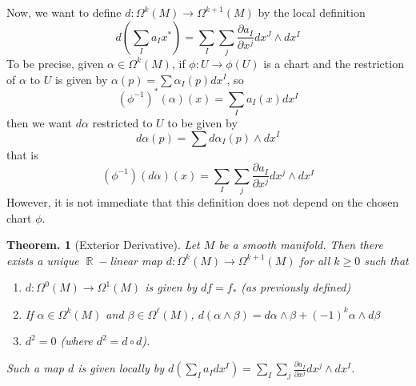 \documentclass[11pt, a4paper]{memoir}
\DeclareMathOperator{\R}{{\mathbb{R}}}
\theoremstyle{change}
\newtheorem{theorem}{Theorem.}[section]
\theoremstyle{plain}
\theoremstyle{nonumberplain}
\newcommand{\prt}[2]{\ensuremath{\frac{\partial #1}{\partial #2}}}
\numberwithin{equation}{section}
\begin{document}
Now, we want to define $d:\Omega^k(M)\to\Omega^{k+1}(M)$ by the local definition
\begin{equation*}
    d\left(\sum_Ia_Ix^*\right)=\sum_I\sum_j\prt{a_I}{x^j}dx^J\wedge dx^I
\end{equation*}
To be precise, given $\alpha\in\Omega^k(M)$, if $\phi:U\to\phi(U)$ is a chart and the restriction of $\alpha$ to $U$ is given by $\alpha(p)=\sum \alpha_I(p)dx^I$, so
\begin{equation*}
    (\phi^{-1})^*(\alpha)(x)=\sum_Ia_I(x)dx^I
\end{equation*}
then we want $d\alpha$ restricted to $U$ to be given by
\begin{equation*}
    d\alpha(p)=\sum d\alpha_I(p)\wedge dx^I
\end{equation*}
that is
\begin{equation*}
    (\phi^{-1})(d\alpha)(x)=\sum_I\sum_j\prt{a_I}{x^j}dx^j\wedge dx^I
\end{equation*}
However, it is not immediate that this definition does not depend on the chosen chart $\phi$.
\begin{theorem}[Exterior Derivative]
    Let $M$ be a smooth manifold.
    Then there exists a unique $\R-$linear map $d:\Omega^k(M)\to\Omega^{k+1}(M)$ for all $k\geq 0$ such that
    \begin{enumerate}[nl]
        \item $d:\Omega^0(M)\to\Omega^1(M)$ is given by $df=f_*$ (as previously defined)
        \item If $\alpha\in\Omega^k(M)$ and $\beta\in\Omega^\ell(M)$, $d(\alpha\wedge\beta)=d\alpha\wedge\beta+(-1)^k\alpha\wedge d\beta$
        \item $d^2=0$ (where $d^2=d\circ d$).
    \end{enumerate}
    Such a map $d$ is given locally by $d\left(\sum_Ia_Idx^I\right)=\sum_I\sum_j\prt{a_I}{x^j}dx^j\wedge dx^I$.
\end{theorem}
\end{document}
